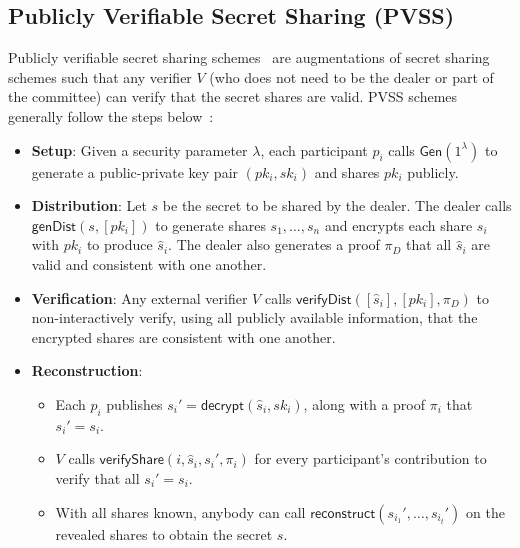 \subsection{Publicly Verifiable Secret Sharing (PVSS)}
Publicly verifiable secret sharing schemes~\cite{first_pvss_chor, pvss_stadler, pvss_schoenmakers,pvss_paillier_ruiz,pvss_pairings_heidervand,pvss_scrape} are augmentations of secret sharing schemes such that any verifier $V$ (who does not need to be the dealer or part of the committee) can verify that the secret shares are valid.
PVSS schemes generally follow the steps below~\cite{pvss_scrape}:
\begin{itemize}
    \item \textbf{Setup}:
    Given a security parameter $\lambda$, each participant $p_i$ calls $\textsf{Gen}(1^{\lambda})$ to generate a public-private key pair $(pk_i, sk_i)$ and shares $pk_i$ publicly.
    \item \textbf{Distribution}:
    Let $s$ be the secret to be shared by the dealer.
    The dealer calls $\textsf{genDist}(s, [pk_i])$ to generate shares $s_1, \dots, s_n$ and encrypts each share $s_i$ with $pk_i$ to produce $\hat{s}_i$.
    The dealer also generates a proof $\pi_D$ that all $\hat{s}_i$ are valid and consistent with one another.
    \item \textbf{Verification}:
    Any external verifier $V$ calls $\textsf{verifyDist}([\hat{s}_i], [pk_i], \pi_D)$ to non-interactively verify, using all publicly available information, that the encrypted shares are consistent with one another.
    \item \textbf{Reconstruction}:
        \begin{itemize}
            \item Each $p_i$ publishes $s_i' = \textsf{decrypt}(\hat{s}_i, sk_i)$, along with a proof $\pi_i$ that $s_i' = s_i$.
            \item $V$ calls $\textsf{verifyShare}(i, \hat{s}_i, s_i', \pi_i)$ for every participant's contribution to verify that all $s_i' = s_i$.
            \item With all shares known, anybody can call $\textsf{reconstruct}(s_{i_1}', \dots, s_{i_t}')$ on the revealed shares to obtain the secret $s$.
        \end{itemize} 
\end{itemize}

